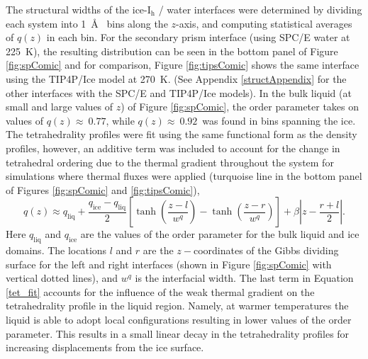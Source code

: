 The structural widths of the ice-I$_\mathrm{h}$ / water interfaces
were determined by dividing each system into 1~\AA~ bins along the
$z$-axis, and computing statistical averages of $q(z)$ in each
bin. For the secondary prism interface (using SPC/E water at 225~K),
the resulting distribution can be seen in the bottom panel of
Figure \ref{fig:spComic} and for comparison, Figure \ref{fig:tipsComic}
shows the same interface using the TIP4P/Ice model at 270~K.  (See
Appendix \ref{structAppendix} for the other interfaces with the SPC/E
and TIP4P/Ice models). In the bulk liquid (at small and large values
of $z$) of Figure \ref{fig:spComic}, the order parameter takes on values
of $q(z) \approx~0.77$, while $q(z) \approx~0.92$~was found in bins
spanning the ice. The tetrahedrality profiles were fit using the same
functional form as the density profiles, however, an additive term was
included to account for the change in tetrahedral ordering due to the
thermal gradient throughout the system for simulations where thermal
fluxes were applied (turquoise line in the bottom panel of Figures
\ref{fig:spComic} and \ref{fig:tipsComic}),
\begin{equation}\label{tet_fit}
q(z) \approx
q_\mathrm{liq}+\frac{q_\mathrm{ice}-q_\mathrm{liq}}{2}\left[\tanh\left(\frac{z-l}{w^q}\right)-\tanh\left(\frac{z-r}{w^q}\right)\right]+\beta\left|z-\frac{r+l}{2}\right|.
\end{equation}
Here $q_\mathrm{liq}$ and $q_\mathrm{ice}$ are the values of the order
parameter for the bulk liquid and ice domains. The locations $l$ and
$r$ are the $z-$coordinates of the Gibbs dividing surface for the left
and right interfaces (shown in Figure \ref{fig:spComic} with vertical
dotted lines), and $w^{q}$ is the interfacial width.  The last term in
Equation \eqref{tet_fit} accounts for the influence of the weak thermal
gradient on the tetrahedrality profile in the liquid region. Namely,
at warmer temperatures the liquid is able to adopt local
configurations resulting in lower values of the order parameter. This
results in a small linear decay in the tetrahedrality profiles for
increasing displacements from the ice surface.

